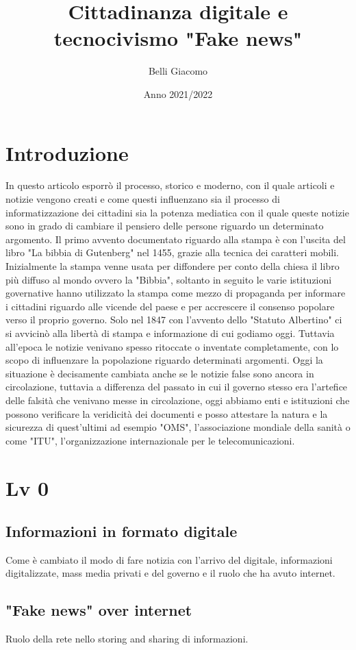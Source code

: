 \documentclass{article}
\title{Cittadinanza digitale e tecnocivismo "Fake news"}
\author{Belli Giacomo }
\date{Anno 2021/2022}
\begin{document}
\maketitle
\section{Introduzione}
In questo articolo esporrò il processo, storico e moderno, con il quale articoli e notizie vengono creati e come questi influenzano sia il processo di informatizzazione dei cittadini sia la potenza mediatica con il quale queste notizie sono in grado di cambiare il pensiero delle persone riguardo un determinato argomento.
Il primo avvento documentato riguardo alla stampa è con l'uscita del libro "La bibbia di Gutenberg" nel 1455, grazie alla tecnica dei caratteri mobili.
Inizialmente la stampa venne usata per diffondere per conto della chiesa il libro più diffuso al mondo ovvero la "Bibbia", soltanto in seguito le varie istituzioni governative hanno utilizzato la stampa come mezzo di propaganda per informare i cittadini riguardo alle vicende del paese e per accrescere il consenso popolare verso il proprio governo.
Solo nel 1847 con l'avvento dello "Statuto Albertino" ci si avvicinò alla libertà di stampa e informazione di cui godiamo oggi.
Tuttavia all'epoca le notizie venivano spesso ritoccate o inventate completamente, con lo scopo di influenzare la popolazione riguardo determinati argomenti.
Oggi la situazione è decisamente cambiata anche se le notizie false sono ancora in circolazione, tuttavia a differenza del passato in cui il governo stesso era l'artefice delle falsità che venivano messe in circolazione, oggi abbiamo enti e istituzioni che possono verificare la veridicità dei documenti e posso attestare la natura e la sicurezza di quest'ultimi ad esempio "OMS", l'associazione mondiale della sanità o come "ITU", l'organizzazione internazionale per le telecomunicazioni.
\section{Lv 0}
\subsection{Informazioni in formato digitale}
Come è cambiato il modo di fare notizia con l'arrivo del digitale, informazioni digitalizzate, mass media privati e del governo e il ruolo che ha avuto internet.
\subsection{"Fake news" over internet}
Ruolo della rete nello storing and sharing di informazioni.
\end{document}

